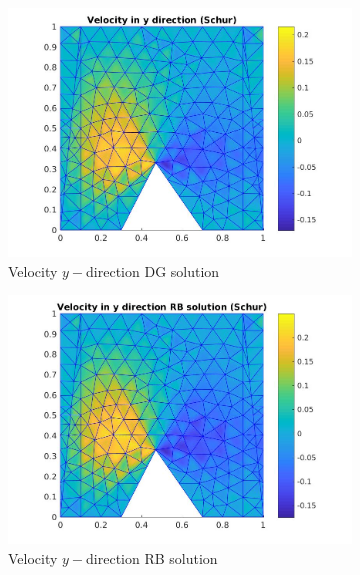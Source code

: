 \documentclass[graybox]{svmult}
\begin{document}
\begin{figure}
\begin{subfigure}{0.31\textwidth}
\includegraphics[width=\linewidth]{offline_velocity_2_at_47_33.jpg}
\caption{Velocity $y-$direction DG solution} \label{vel_y_dg}
\end{subfigure}\hspace*{\fill}
\begin{subfigure}{0.31\textwidth}
\includegraphics[width=\linewidth]{online_velocity_2_at_47_33.jpg}
\caption{Velocity $y-$direction RB solution} \label{vel_y_rb}
\end{subfigure}
\begin{subfigure}{0.31\textwidth}

\end{subfigure}
\end{figure}
\end{document}
